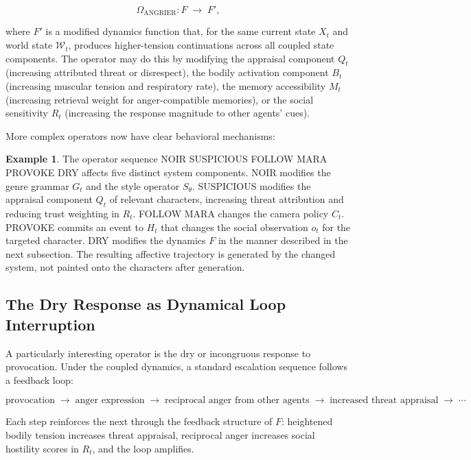 \documentclass[11pt,a4paper]{article}
\theoremstyle{plain}
\theoremstyle{definition}
\newtheorem{example}[theorem]{Example}
\theoremstyle{remark}
\begin{document}
\[
\Omega_{\mathrm{ANGRIER}} : F \;\to\; F',
\]

where $F'$ is a modified dynamics function that, for the same current state $X_t$ and world state $\mathcal{W}_t$, produces higher-tension continuations across all coupled state components. The operator may do this by modifying the appraisal component $Q_t$ (increasing attributed threat or disrespect), the bodily activation component $B_t$ (increasing muscular tension and respiratory rate), the memory accessibility $M_t$ (increasing retrieval weight for anger-compatible memories), or the social sensitivity $R_t$ (increasing the response magnitude to other agents' cues).

More complex operators now have clear behavioral mechanisms:

\begin{example}
The operator sequence \textsc{NOIR} \textsc{SUSPICIOUS} \textsc{FOLLOW MARA} \textsc{PROVOKE} \textsc{DRY} affects five distinct system components. \textsc{NOIR} modifies the genre grammar $G_t$ and the style operator $S_\theta$. \textsc{SUSPICIOUS} modifies the appraisal component $Q_t$ of relevant characters, increasing threat attribution and reducing trust weighting in $R_t$. \textsc{FOLLOW MARA} changes the camera policy $C_t$. \textsc{PROVOKE} commits an event to $H_t$ that changes the social observation $o_t$ for the targeted character. \textsc{DRY} modifies the dynamics $F$ in the manner described in the next subsection. The resulting affective trajectory is generated by the changed system, not painted onto the characters after generation.
\end{example}

\subsection{The Dry Response as Dynamical Loop Interruption}

A particularly interesting operator is the dry or incongruous response to provocation. Under the coupled dynamics, a standard escalation sequence follows a feedback loop:

\[
\text{provocation} \;\to\; \text{anger expression} \;\to\; \text{reciprocal anger from other agents} \;\to\; \text{increased threat appraisal} \;\to\; \cdots
\]

Each step reinforces the next through the feedback structure of $F$: heightened bodily tension increases threat appraisal, reciprocal anger increases social hostility scores in $R_t$, and the loop amplifies.
\end{document}
